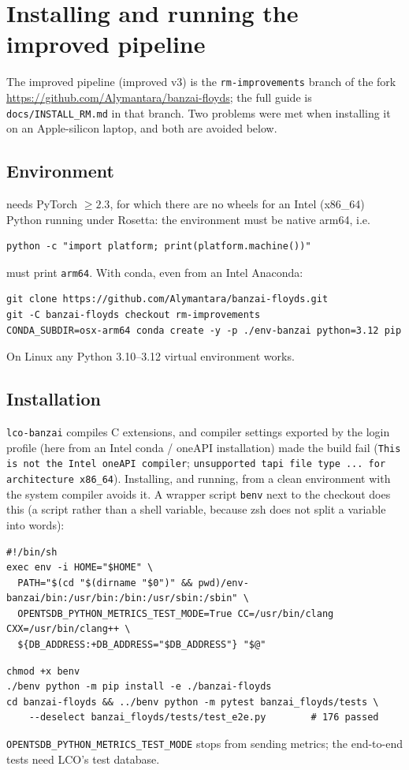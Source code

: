 \chapter{Installing and running the improved pipeline}
\label{sec:app_install}
The improved pipeline (improved v3) is the \texttt{rm-improvements} branch of the fork
\url{https://github.com/Alymantara/banzai-floyds}; the full guide is \texttt{docs/INSTALL\_RM.md} in that branch.
Two problems were met when installing it on an Apple-silicon laptop, and both are avoided below.

\section{Environment}
\banzai{} needs PyTorch $\ge2.3$, for which there are no wheels for an Intel (x86\_64) Python running under Rosetta:
the environment must be native arm64, i.e.
\begin{verbatim}
python -c "import platform; print(platform.machine())"
\end{verbatim}
must print \texttt{arm64}. With conda, even from an Intel Anaconda:
\begin{verbatim}
git clone https://github.com/Alymantara/banzai-floyds.git
git -C banzai-floyds checkout rm-improvements
CONDA_SUBDIR=osx-arm64 conda create -y -p ./env-banzai python=3.12 pip
\end{verbatim}
On Linux any Python 3.10--3.12 virtual environment works.

\section{Installation}
\texttt{lco-banzai} compiles C extensions, and compiler settings exported by the login profile (here from an Intel
conda / oneAPI installation) made the build fail (\texttt{This is not the Intel oneAPI compiler};
\texttt{unsupported tapi file type ... for architecture x86\_64}). Installing, and running, from a clean environment
with the system compiler avoids it. A wrapper script \texttt{benv} next to the checkout does this (a script rather than a shell variable, because zsh
does not split a variable into words):
\begin{verbatim}
#!/bin/sh
exec env -i HOME="$HOME" \
  PATH="$(cd "$(dirname "$0")" && pwd)/env-banzai/bin:/usr/bin:/bin:/usr/sbin:/sbin" \
  OPENTSDB_PYTHON_METRICS_TEST_MODE=True CC=/usr/bin/clang CXX=/usr/bin/clang++ \
  ${DB_ADDRESS:+DB_ADDRESS="$DB_ADDRESS"} "$@"
\end{verbatim}
\begin{verbatim}
chmod +x benv
./benv python -m pip install -e ./banzai-floyds
cd banzai-floyds && ../benv python -m pytest banzai_floyds/tests \
    --deselect banzai_floyds/tests/test_e2e.py        # 176 passed
\end{verbatim}
\texttt{OPENTSDB\_PYTHON\_METRICS\_TEST\_MODE} stops \banzai{} from sending metrics; the end-to-end tests need LCO's
test database.

